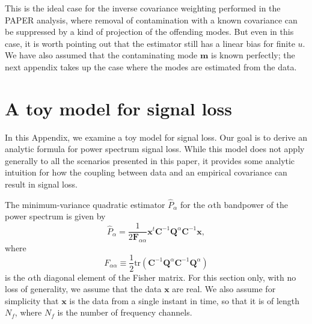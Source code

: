 \documentclass[preprint2,numberedappendix,tighten]{aastex6}  %
\newcommand{\x}{\mathbf{x}}
\newcommand{\C}{\mathbf{C}}
\newcommand{\F}{\mathbf{F}}
\newcommand{\Q}{\mathbf{Q}}
\begin{document}
This is the ideal case for the inverse covariance weighting performed in the PAPER analysis, where removal of contamination with a known covariance can be suppressed by a kind of projection of the offending modes.  But even in this case, it is worth pointing out that the estimator still has a linear bias for finite $u$.  We have also assumed that the contaminating mode $\mathbf{m}$ is known perfectly; the next appendix takes up the case where the modes are estimated from the data.

\color{black}

\section{A toy model for signal loss}
\label{sec:sigloss_appendix}

In this Appendix, we examine a toy model for signal loss. Our goal is to derive an analytic formula for power spectrum signal loss. While this model does not apply generally to all the scenarios presented in this paper, it provides some analytic intuition for how the coupling between data and an empirical covariance can result in signal loss.

The minimum-variance quadratic estimator $\widehat{P}_\alpha$ for the $\alpha$th bandpower of the power spectrum is given by 
\begin{equation}
\widehat{P}_\alpha = \frac{1} {2 \F_{\alpha \alpha} }\x^t \C^{-1} \Q^{\alpha} \C^{-1} \x,
\end{equation}
where
\begin{equation}
F_{\alpha \alpha} \equiv \frac{1}{2} \textrm{tr} \left( \C^{-1} \Q^\alpha \C^{-1} \Q^\alpha \right)
\end{equation}
is the $\alpha$th diagonal element of the Fisher matrix. For this section only, with no loss of generality, we assume that the data $\textbf{x}$ are real. We also assume for simplicity that $\mathbf{x}$ is the data from a single instant in time, so that it is of length $N_f$, where $N_f$ is the number of frequency channels.
\end{document}
